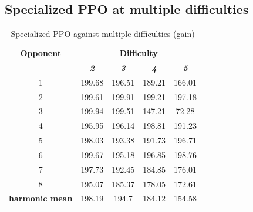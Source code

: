 \documentclass[conference]{IEEEtran}
\begin{document}
    \subsection{Specialized PPO at multiple difficulties}\label{subsec:specialized-ppo-at-multiple-difficulties}

    \begin{table}[htbp]
        \caption{Specialized PPO against multiple difficulties (gain)}
        \begin{center}
            \begin{tabular}{|c|c|c|c|c|}
                \hline
                \textbf{Opponent} & \multicolumn{4}{|c|}{\textbf{Difficulty}} \\
                \cline{2-5}
                & \textbf{\textit{2}} & \textbf{\textit{3}} & \textbf{\textit{4}} & \textbf{\textit{5}} \\
                \hline
                1                      & 199.68              & 196.51              & 189.21              & 166.01              \\
                2                      & 199.61              & 199.91              & 199.21              & 197.18              \\
                3                      & 199.94              & 199.51              & 147.21              & 72.28               \\
                4                      & 195.95              & 196.14              & 198.81              & 191.23              \\
                5                      & 198.03              & 193.38              & 191.73              & 196.71              \\
                6                      & 199.67              & 195.18              & 196.85              & 198.76              \\
                7                      & 197.73              & 192.45              & 184.85              & 176.01              \\
                8                      & 195.07              & 185.37              & 178.05              & 172.61              \\
                \hline
                \textbf{harmonic mean} & 198.19              & 194.7               & 184.12              & 154.58              \\
                \hline
            \end{tabular}
            \label{Specialized PPO against multiple difficulties (gain)}
        \end{center}
    \end{table}
\end{document}
